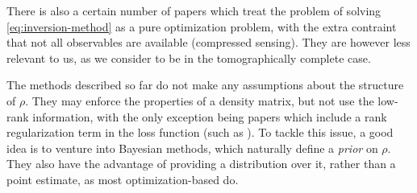 \documentclass[12pt]{memoir}
\newcommand{\tr}{\text{tr}}
\newcommand{\mb}{\mathbf}
\begin{document}
There is also a certain number of papers \cite{meth:CS:GLFSBE10,meth:CS:Gross-2011, meth:CS:Flammia-2012,meth:CS:Koltchinskii-2011} which treat the problem of solving \ref{eq:inversion-method} as a pure optimization problem, with the extra contraint that not all observables are available (compressed sensing). They are however less relevant to us, as we consider to be in the tomographically complete case.\medbreak



The methods described so far do not make any assumptions about the structure of $\rho$. They may enforce the properties of a density matrix, but not use the low-rank information, with the only exception being papers which include a rank regularization term in the loss function (such as \cite{meth:linear-inversion:alquier}). To tackle this issue, a good idea is to venture into Bayesian methods, which naturally define a \textit{prior} on $\rho$. They also have the advantage of providing a distribution over it, rather than a point estimate, as most optimization-based do.\medbreak
\end{document}

